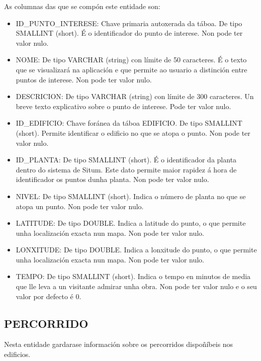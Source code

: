 As columnas das que se compón este entidade son:
\begin{itemize}
	\item ID\_PUNTO\_INTERESE: Chave primaria autoxerada da táboa. De tipo SMALLINT (short). É o identificador do punto de interese. Non pode ter valor nulo.
	\item NOME: De tipo VARCHAR (string) con límite de 50 caracteres. É o texto que se visualizará na aplicación e que permite ao usuario a distinción entre puntos de interese. Non pode ter valor nulo.
	\item DESCRICION: De tipo VARCHAR (string) con límite de 300 caracteres. Un breve texto explicativo sobre o punto de interese. Pode ter valor nulo.
	\item ID\_EDIFICIO: Chave foránea da táboa EDIFICIO. De tipo SMALLINT (short). Permite identificar o edificio no que se atopa o punto. Non pode ter valor nulo.
	\item ID\_PLANTA: De tipo SMALLINT (short). É o identificador da planta dentro do sistema de Situm. Este dato permite maior rapidez á hora de identificador os puntos dunha planta. Non pode ter valor nulo.
	\item NIVEL: De tipo SMALLINT (short). Indica o número de planta no que se atopa un punto. Non pode ter valor nulo.
	\item LATITUDE: De tipo DOUBLE. Indica a latitude do punto, o que permite unha localización exacta nun mapa. Non pode ter valor nulo.
	\item LONXITUDE: De tipo DOUBLE. Indica a lonxitude do punto, o que permite unha localización exacta nun mapa. Non pode ter valor nulo.
	\item TEMPO: De tipo SMALLINT (short). Indica o tempo en minutos de media que lle leva a un visitante admirar unha obra. Non pode ter valor nulo e o seu valor por defecto é 0.
\end{itemize}


\subsection{PERCORRIDO}
Nesta entidade gardarase información sobre os percorridos dispoñíbeis nos edificios.

